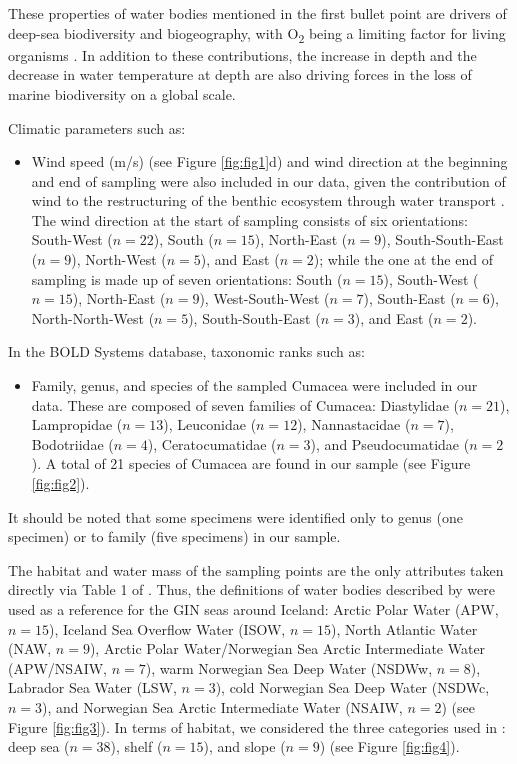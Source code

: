 These properties of water bodies mentioned in the first bullet point are drivers of deep-sea biodiversity and biogeography, with O\textsubscript{2} being a limiting factor for living organisms \citep{keeling_ocean_2010}. In addition to these contributions, the increase in depth \citep{rex_global_2006,costello_marine_2017} and the decrease in water temperature at depth \citep{lambshead_latitudinal_2000} are also driving forces in the loss of marine biodiversity on a global scale.

Climatic parameters such as: 
\begin{itemize}
\item Wind speed (m/s) (see Figure \ref{fig:fig1}d) and wind direction at the beginning and end of sampling were also included in our data, given the contribution of wind to the restructuring of the benthic ecosystem through water transport \citep{waga_recent_2020,saeedi_environmental_2022}. 
The wind direction at the start of sampling consists of six orientations: South-West ($n=22$), South ($n=15$), North-East ($n=9$), South-South-East ($n=9$), North-West ($n=5$), and East ($n=2$); while the one at the end of sampling is made up of seven orientations: South ($n=15$), South-West ($n=15$), North-East ($n=9$), West-South-West ($n=7$), South-East ($n=6$), North-North-West ($n=5$), South-South-East ($n=3$), and East ($n=2$). 
\end{itemize}

In the BOLD Systems database, taxonomic ranks such as: 
\begin{itemize}
\item Family, genus, and species of the sampled Cumacea were included in our data. These are composed of seven families of Cumacea: Diastylidae ($n=21$), Lampropidae ($n=13$), Leuconidae ($n=12$), Nannastacidae ($n=7$), Bodotriidae ($n=4$), Ceratocumatidae ($n=3$), and Pseudocumatidae ($n=2$). A total of 21 species of Cumacea are found in our sample (see Figure \ref{fig:fig2}).
\end{itemize}

It should be noted that some specimens were identified only to genus (one specimen) or to family (five specimens) in our sample.
 
The habitat and water mass of the sampling points are the only attributes taken directly via Table 1 of \citep{uhlir_adding_2021}. Thus, the definitions of water bodies described by \citep{hansen_north_2000, brix2010distribution, ostmann_marine_2014} were used as a reference for the GIN seas around Iceland: Arctic Polar Water (APW, $n=15$), Iceland Sea Overflow Water (ISOW, $n=15$), North Atlantic Water (NAW, $n=9$), Arctic Polar Water/Norwegian Sea Arctic Intermediate Water (APW/NSAIW, $n=7$), warm Norwegian Sea Deep Water (NSDWw, $n=8$), Labrador Sea Water (LSW, $n=3$), cold Norwegian Sea Deep Water (NSDWc, $n=3$), and Norwegian Sea Arctic Intermediate Water (NSAIW, $n=2$) (see Figure \ref{fig:fig3}). In terms of habitat, we considered the three categories used in \citep{uhlir_adding_2021}: deep sea ($n=38$), shelf ($n=15$), and slope ($n=9$) (see Figure \ref{fig:fig4}).

